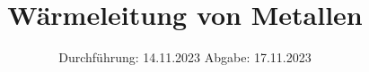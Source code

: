 


\subject{V204}
\title{Wärmeleitung von Metallen}
\date{%
  Durchführung: 14.11.2023
  \hspace{3em}
  Abgabe: 17.11.2023
}



\maketitle
\thispagestyle{empty}
\tableofcontents
\newpage






\printbibliography{}


